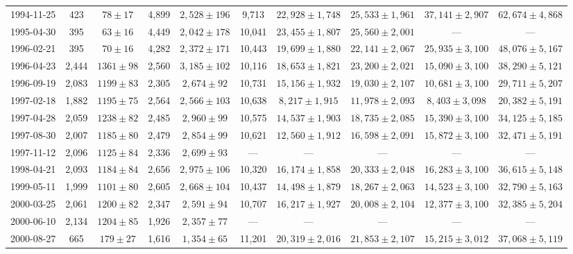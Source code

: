 \begin{landscape}
\begin{longtable}{cccccccccc}
{1994-11-25} & 423 & {$78  \pm  17$} & 4,899 & {$2,528 \pm 196$} & 9,713 & {$22,928 \pm 1,748$} & {$25,533 \pm 1,961$} & {$37,141 \pm 2,907$} & {$62,674 \pm 4,868$} \\
{1995-04-30} & 395 & {$63  \pm  16$} & 4,449 & {$2,042 \pm 178$} & 10,041 & {$23,455 \pm 1,807$} & {$25,560 \pm 2,001$} & --- & --- \\
{1996-02-21} & 395 & {$70  \pm  16$} & 4,282 & {$2,372 \pm 171$} & 10,443 & {$19,699 \pm 1,880$} & {$22,141 \pm 2,067$} & {$25,935 \pm 3,100$} & {$48,076 \pm 5,167$} \\
{1996-04-23} & 2,444 & {$1361  \pm  98$} & 2,560 & {$3,185 \pm 102$} & 10,116 & {$18,653 \pm 1,821$} & {$23,200 \pm 2,021$} & {$15,090 \pm 3,100$} & {$38,290 \pm 5,121$} \\
{1996-09-19} & 2,083 & {$1199  \pm  83$} & 2,305 & {$2,674 \pm 92$} & 10,731 & {$15,156 \pm 1,932$} & {$19,030 \pm 2,107$} & {$10,681 \pm 3,100$} & {$29,711 \pm 5,207$} \\
{1997-02-18} & 1,882 & {$1195  \pm  75$} & 2,564 & {$2,566 \pm 103$} & 10,638 & {$8,217 \pm 1,915$} & {$11,978 \pm 2,093$} & {$8,403 \pm 3,098$} & {$20,382 \pm 5,191$} \\
{1997-04-28} & 2,059 & {$1238  \pm  82$} & 2,485 & {$2,960 \pm 99$} & 10,575 & {$14,537 \pm 1,903$} & {$18,735 \pm 2,085$} & {$15,390 \pm 3,100$} & {$34,125 \pm 5,185$} \\
{1997-08-30} & 2,007 & {$1185  \pm  80$} & 2,479 & {$2,854 \pm 99$} & 10,621 & {$12,560 \pm 1,912$} & {$16,598 \pm 2,091$} & {$15,872 \pm 3,100$} & {$32,471 \pm 5,191$} \\
{1997-11-12} & 2,096 & {$1125  \pm  84$} & 2,336 & {$2,699 \pm 93$} & --- & --- & --- & --- & --- \\
{1998-04-21} & 2,093 & {$1184  \pm  84$} & 2,656 & {$2,975 \pm 106$} & 10,320 & {$16,174 \pm 1,858$} & {$20,333 \pm 2,048$} & {$16,283 \pm 3,100$} & {$36,615 \pm 5,148$} \\
{1999-05-11} & 1,999 & {$1101  \pm  80$} & 2,605 & {$2,668 \pm 104$} & 10,437 & {$14,498 \pm 1,879$} & {$18,267 \pm 2,063$} & {$14,523 \pm 3,100$} & {$32,790 \pm 5,163$} \\
{2000-03-25} & 2,061 & {$1200  \pm  82$} & 2,347 & {$2,591 \pm 94$} & 10,707 & {$16,217 \pm 1,927$} & {$20,008 \pm 2,104$} & {$12,377 \pm 3,100$} & {$32,385 \pm 5,204$} \\
{2000-06-10} & 2,134 & {$1204  \pm  85$} & 1,926 & {$2,357 \pm 77$} & --- & --- & --- & --- & --- \\
{2000-08-27} & 665 & {$179  \pm  27$} & 1,616 & {$1,354 \pm 65$} & 11,201 & {$20,319 \pm 2,016$} & {$21,853 \pm 2,107$} & {$15,215 \pm 3,012$} & {$37,068 \pm 5,119$} \\

\end{longtable}
\end{landscape}
